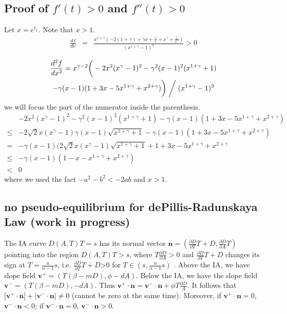 \documentclass[review,authoryear]{elsarticle}
\begin{document}
\subsection*{Proof of $f'(t)>0$ and $f''(t)>0$ }

Let $x=e^{t_{1}}$. Note that $x>1$. 
\begin{eqnarray*}
\frac{df}{dx} & = & \frac{x^{1+\gamma}(-2(1+\gamma)+\gamma x+\frac{\gamma}{x}+x^{\gamma}+\frac{1}{x^{\gamma}})}{(x^{1+\gamma}-1)^{2}}>0\\
\end{eqnarray*}
\begin{multline*}
\frac{d^{2}f}{dx^{2}}  =   x^{\gamma-2}\bigg(  -2x^{2}(x^{\gamma}-1)^{2}-\gamma^{2}(x-1)^{2}(x^{1+\gamma}+1)\\-\gamma(x-1)(1+3x-5x^{1+\gamma}+x^{2+\gamma}) \bigg)  \biggm/ (x^{1+\gamma}-1)^{3}
\end{multline*}
we will focus the part of the numerator inside the parenthesis. 
\begin{align*}
 & -2x^{2}(x^{\gamma}-1)^{2}-\gamma^{2}(x-1)^{2}(x^{1+\gamma}+1)-\gamma(x-1)(1+3x-5x^{1+\gamma}+x^{2+\gamma})\\
\le & -2\sqrt{2}x(x^{\gamma}-1)\gamma(x-1)\sqrt{x^{1+\gamma}+1}-\gamma(x-1)(1+3x-5x^{1+\gamma}+x^{2+\gamma})\\
= & -\gamma(x-1)(2\sqrt{2}x(x^{\gamma}-1)\sqrt{x^{1+\gamma}+1}+1+3x-5x^{1+\gamma}+x^{2+\gamma}\\
\le & -\gamma(x-1)(1-x-x^{1+\gamma}+x^{2+\gamma})\\
< & 0
\end{align*}
where we used the fact $-a^{2}-b^{2}<-2ab$ and $x>1$. 

\subsection*{no pseudo-equilibrium for dePillis-Radunskaya Law (work in progress)}

The IA curve $D(A,T)T=s$ has its normal vector $\mathbf{n}=(\frac{\partial D}{\partial T}T+D,\frac{\partial D}{\partial A}T)$
pointing into the region $D(A,T)T>s$, where $T\frac{\partial D}{\partial A}>0$
and $\frac{\partial D}{\partial T}T+D$ changes its sign at $T=\frac{n}{n-1}s$,
i.e. $\frac{\partial D}{\partial T}T+D$\textgreater 0 for $T\in(s,\frac{n}{n-1}s)$
. Above the IA, we have slope field $\mathbf{v}^{+}=(T(\beta-mD),\phi-dA).$
Below the IA, we have the slope field $\mathbf{v}^{-}=(T(\beta-mD),-dA).$
Thus $\mathbf{v}^{+}\cdot\mathbf{n}=\mathbf{v}^{-}\cdot\mathbf{n}+\phi T\frac{\partial D}{A}$.
It follows that $|\mathbf{v}^{+}\cdot\mathbf{n}|+|\mathbf{v}^{-}\cdot\mathbf{n}|\ne0$
(cannot be zero at the same time). Moreover, if $\mathbf{v}^{+}\cdot\mathbf{n}=0$,
$\mathbf{v}^{-}\cdot\mathbf{n}<0$; if $\mathbf{v}^{-}\cdot\mathbf{n}=0$,
$\mathbf{v}^{-}\cdot\mathbf{n}>0$.
\end{document}
